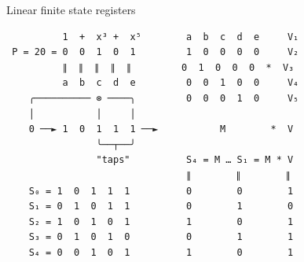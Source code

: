 \documentclass{beamer}
\begin{document}
    \begin{frame}[fragile]{Linear finite state registers}
        \begin{verbatim}
          1  +  x³ +  x⁵        a  b  c  d  e     V₁
 P = 20 = 0  0  1  0  1         1  0  0  0  0     V₂
          ∥  ∥  ∥  ∥  ∥         0  1  0  0  0  *  V₃
          a  b  c  d  e         0  0  1  0  0     V₄
    ╭────────── ⊗ ────╮         0  0  0  1  0     V₅
    │           │     │
    0 ──► 1  0  1  1  1 ──►           M        *  V
                ╰──┬──╯
                "taps"          S₄ = M … S₁ = M * V
                                ∥        ∥        ∥
    S₀ = 1  0  1  1  1          0        0        1
    S₁ = 0  1  0  1  1          0        1        0
    S₂ = 1  0  1  0  1          1        0        1
    S₃ = 0  1  0  1  0          0        1        1
    S₄ = 0  0  1  0  1          1        0        1
        \end{verbatim}
    \end{frame}
\end{document}
